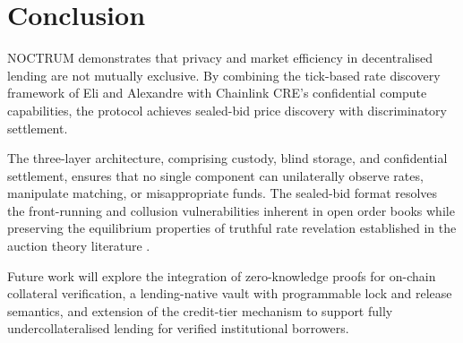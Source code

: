 \documentclass[a4paper,11pt]{article}
\begin{document}
\section{Conclusion}

NOCTRUM demonstrates that privacy and market efficiency in decentralised
lending are not mutually exclusive. By combining the tick-based rate
discovery framework of Eli and Alexandre \cite{eli2025} with Chainlink
CRE's confidential compute capabilities, the protocol achieves sealed-bid
price discovery with discriminatory settlement.

The three-layer architecture, comprising custody, blind storage, and
confidential settlement, ensures that no single component can unilaterally
observe rates, manipulate matching, or misappropriate funds. The sealed-bid
format resolves the front-running and collusion vulnerabilities inherent in
open order books while preserving the equilibrium properties of truthful
rate revelation established in the auction theory literature
\cite{milgrom1982, ausubel2004, klemperer2004}.

Future work will explore the integration of zero-knowledge proofs for
on-chain collateral verification, a lending-native vault with programmable
lock and release semantics, and extension of the credit-tier mechanism to
support fully undercollateralised lending for verified institutional
borrowers.
\end{document}
